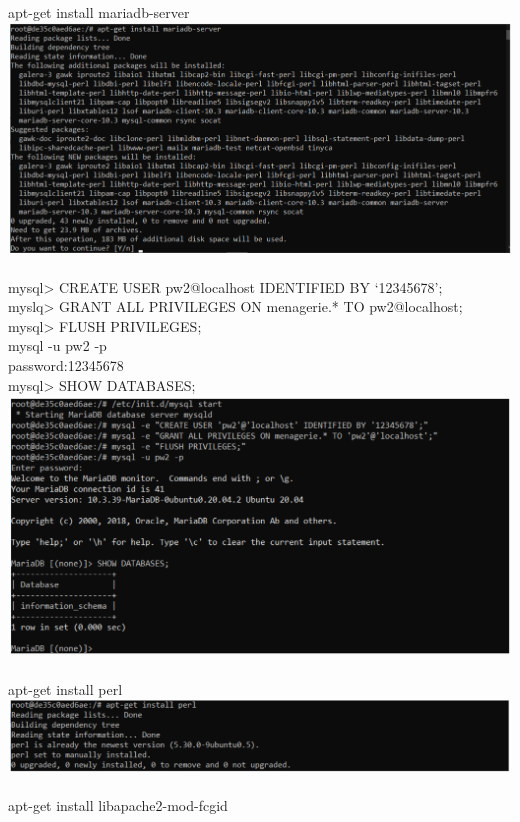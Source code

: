 \documentclass{article}
\begin{document}
\\
\\
apt-get install mariadb-server\\
\includegraphics[width=\textwidth]{img/c7.png}
\\
\\
mysql> CREATE USER pw2@localhost IDENTIFIED BY ‘12345678’;\\
myslq> GRANT ALL PRIVILEGES ON menagerie.* TO pw2@localhost;\\
mysql> FLUSH PRIVILEGES;\\
mysql -u pw2 -p\\
password:12345678\\
mysql> SHOW DATABASES;\\
\includegraphics[width=\textwidth]{img/c8.png}
\\
\\
apt-get install perl\\
\includegraphics[width=\textwidth]{img/c9.png}
\\
\\
apt-get install libapache2-mod-fcgid\\
\end{document}
